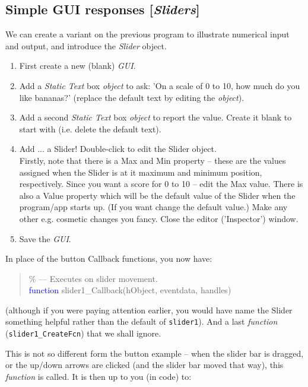 \documentclass{tufte-book} %
\newenvironment{docspec}{\begin{quotation}\ttfamily\parskip0pt\parindent0pt\ignorespaces}{\end{quotation}}
\begin{document}

\subsection{Simple GUI responses [\textit{Sliders}]}

We can create a variant on the previous program to illustrate numerical input and output, and introduce the \textit{Slider} object.

\begin{enumerate}
\setlength{\itemindent}{.2in}
\item First create a new (blank) \textit{GUI}.
\item Add a \textit{Static Text} box \textit{object} to ask: 'On a scale of 0 to 10, how much do you like bananas?' (replace the default text by editing the \textit{object}).
\item Add a second \textit{Static Text} box \textit{object} to report the value. Create it blank to start with (i.e. delete the default text).
\item Add ... a \textsf{Slider}! Double-click to edit the \textsf{Slider} object.
\\Firstly, note that there is a \textsf{Max} and \textsf{Min} property -- these are the values assigned when the \textsf{Slider} is at it maximum and minimum position, respectively. Since you want a score for 0 to 10 -- edit the \textsf{Max} value. There is also a \textsf{Value} property which will be the default value of the \textsf{Slider} when the program/app starts up. (If you want change the default value.) Make any other e.g. cosmetic changes you fancy. Close the editor ('\textsf{Inspector}') window.
\item Save the \textit{GUI}.
\end{enumerate}

In place of the button Callback functions,  you now have:

\begin{docspec}
\textcolor[rgb]{0,0.501961,0}{\% --- Executes on slider movement.}
\\\textcolor{blue}{function} slider1\_Callback(hObject, eventdata, handles)
\end{docspec}
(although if you were paying attention earlier, you would have name the \textsf{Slider} something helpful rather than the default of \texttt{slider1}). And a last \textit{function} (\texttt{slider1\_CreateFcn}) that we shall ignore.

This is not so different form the button example -- when the slider bar is dragged, or the up/down arrows are clicked (and the slider bar moved that way), this \textit{function} is called. It is then up to you (in code) to:
\end{document}
